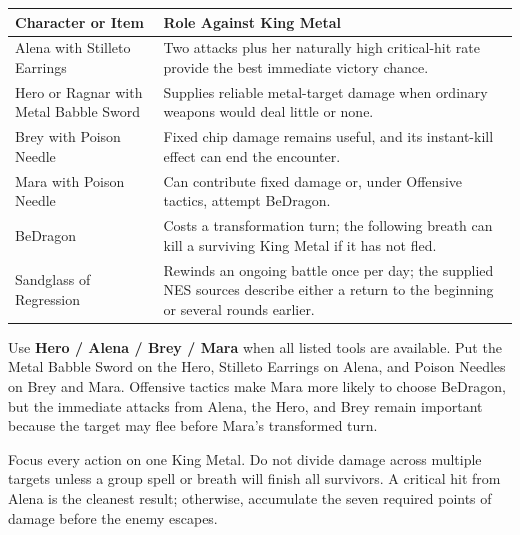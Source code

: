 \documentclass[
  american,
  10pt,
  letterpaper,
  oneside,
  open=any]{scrreprt}
\newcounter{none} %
\newenvironment{guidetable}{%
  \small\setstretch{1.0}%
  \setlength{\tabcolsep}{4pt}%
  \setlength{\LTpre}{8pt}\setlength{\LTpost}{10pt}%
  \renewcommand{\arraystretch}{1.16}%
}{ }
\begin{document}
\begin{guidetable}

{\def\LTcaptype{none} %
\begin{longtable}[]{@{}
  >{\raggedright\arraybackslash}p{}
  >{\raggedright\arraybackslash}p{}@{}}
\toprule\noalign{}
\begin{minipage}[b]{\linewidth}\raggedright
\color{GuideGreen}\bfseries Character or Item
\end{minipage} & \begin{minipage}[b]{\linewidth}\raggedright
\color{GuideGreen}\bfseries Role Against King Metal
\end{minipage} \\
\midrule\noalign{}
\endhead
\bottomrule\noalign{}
\endlastfoot
Alena with Stilleto Earrings & Two attacks plus her naturally high
critical-hit rate provide the best immediate victory chance. \\
Hero or Ragnar with Metal Babble Sword & Supplies reliable metal-target
damage when ordinary weapons would deal little or none. \\
Brey with Poison Needle & Fixed chip damage remains useful, and its
instant-kill effect can end the encounter. \\
Mara with Poison Needle & Can contribute fixed damage or, under
Offensive tactics, attempt BeDragon. \\
BeDragon & Costs a transformation turn; the following breath can kill a
surviving King Metal if it has not fled. \\
Sandglass of Regression & Rewinds an ongoing battle once per day; the
supplied NES sources describe either a return to the beginning or
several rounds earlier. \\
\end{longtable}
}

\end{guidetable}

Use \textbf{Hero / Alena / Brey / Mara} when all listed tools are
available. Put the Metal Babble Sword on the Hero, Stilleto Earrings on
Alena, and Poison Needles on Brey and Mara. Offensive tactics make Mara
more likely to choose BeDragon, but the immediate attacks from Alena,
the Hero, and Brey remain important because the target may flee before
Mara's transformed turn.

Focus every action on one King Metal. Do not divide damage across
multiple targets unless a group spell or breath will finish all
survivors. A critical hit from Alena is the cleanest result; otherwise,
accumulate the seven required points of damage before the enemy escapes.
\end{document}
